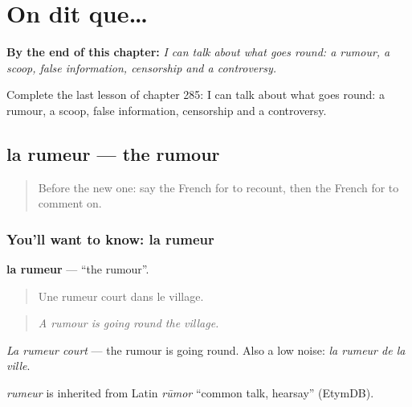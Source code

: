 
\chapter{On dit que…}
\label{ch:fr-on-dit-que}

\begin{chapteropening}
\textbf{By the end of this chapter:} \emph{I can talk about what goes round: a rumour, a scoop, false information, censorship and a controversy.}

Complete the last lesson of chapter 285: I can talk about what goes round: a rumour, a scoop, false information, censorship and a controversy.
\end{chapteropening}

\section[la rumeur]{la rumeur — the rumour}

\label{lesson:FR-C285-rumeur}



\begin{quote}
Before the new one: say the French for to recount, then the French for to comment on.
\end{quote}

\subsection*{You'll want to know: la rumeur}
\textbf{la rumeur} — \textquotedblleft{}the rumour\textquotedblright{}.

\begin{quote}
Une rumeur court dans le village.
\end{quote}

\begin{quote}
\emph{A rumour is going round the village.}
\end{quote}

\emph{La rumeur court} — the rumour is going round. Also a low noise: \emph{la rumeur de la ville}.

\begin{cousinweb}
\emph{rumeur} is inherited from Latin \emph{rūmor} \textquotedblleft{}common talk, hearsay\textquotedblright{} (EtymDB).
\end{cousinweb}

